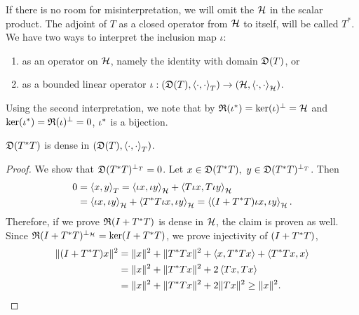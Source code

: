 If there is no room for misinterpretation,
we will omit the $\mathcal{H}$ in the scalar product. The adjoint of $T$ as a closed 
operator from $\mathcal{H}$ to itself, will be called $T^*$. 
We have two ways to interpret the inclusion map $\iota$:
\begin{enumerate}
 \item as an operator on $\mathcal{H}$, namely the identity with domain $\mathfrak{D}(T)$, or
 \item as a bounded linear operator $\iota : ( \mathfrak{D}(T) , \left\langle \cdot, \cdot \right\rangle_T)
 \to ( \mathcal{H} , \left\langle \cdot, \cdot \right\rangle_{\mathcal{H}})$.
\end{enumerate}
Using the second interpretation, we note that by 
$\mathfrak{R}(\iota^{*}) = \ker(\iota)^\perp =\mathcal{H}$
and $\ker(\iota^{*}) = \mathfrak{R}(\iota)^\perp = 0$, $\iota^{*}$ is a bijection.
\begin{lem}\label{TTstrDense}
 $\mathfrak{D}(T^{*} T)$ is dense in $( \mathfrak{D}(T) , \left\langle \cdot, \cdot \right\rangle_T)$.
\end{lem}
\begin{proof}
 We show that $\mathfrak{D}(T ^{*} T)^{\perp_T} = 0$. Let $x \in \mathfrak{D}(T ^{*} T), 
 ~y \in \mathfrak{D}(T ^{*} T)^{\perp_T}$. Then
 \begin{align*}
  0 &=\left\langle x, y \right\rangle_T = \left\langle \iota x, \iota y \right\rangle_{\mathcal{H}} + \left\langle T\iota x, T\iota y \right\rangle
  _{\mathcal{H}} \\
  &=\left\langle \iota x, \iota y \right\rangle_{\mathcal{H}} + \left\langle T^{*} T\iota x, \iota y \right\rangle_{\mathcal{H}}
= \left\langle (I + T ^{*} T) \iota x, \iota y \right\rangle_{\mathcal{H}}.
 \end{align*}
Therefore, if we prove $\mathfrak{R}(I + T^{*} T)$ is dense in $\mathcal{H}$, the claim is
proven as well. Since $\mathfrak{R}(I + T^{*} T)^{\perp_{\mathcal{H}}} = \ker(I + T^{*} T)$, we prove
injectivity of $(I + T^{*} T)$,
\begin{align*}
 \| (I + T^{*} T)x \| ^2  
 &= \|x \| ^2 + \| T ^{*} T x\| ^2 + \left\langle x, T^{*} T x \right\rangle
 + \left\langle T ^{*} T x, x \right\rangle\\
 &=\|x \| ^2 + \| T ^{*} T x\| ^2 + 2\left\langle Tx,  T x \right\rangle \\
 &= \|x \| ^2 + \| T ^{*} T x\| ^2 + 2\|T x\|^2 \geq \|x\|^2.
\end{align*}

\end{proof}


